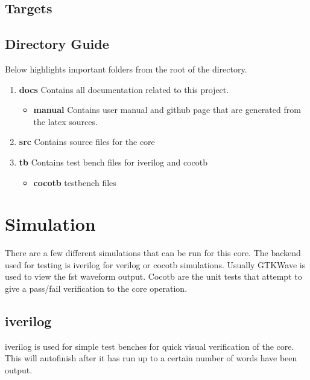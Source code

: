 \subsection{Targets}



\subsection{Directory Guide}

\par
Below highlights important folders from the root of the directory.

\begin{enumerate}
  \item \textbf{docs} Contains all documentation related to this project.
    \begin{itemize}
      \item \textbf{manual} Contains user manual and github page that are generated from the latex sources.
    \end{itemize}
  \item \textbf{src} Contains source files for the core
  \item \textbf{tb} Contains test bench files for iverilog and cocotb
    \begin{itemize}
      \item \textbf{cocotb} testbench files
    \end{itemize}
\end{enumerate}

\newpage

\section{Simulation}
\par
There are a few different simulations that can be run for this core. The backend used for testing is iverilog for verilog or cocotb simulations. Usually GTKWave is used to view the fst waveform output. Cocotb are the unit tests that attempt to give a pass/fail verification to the core operation.

\subsection{iverilog}
\par
iverilog is used for simple test benches for quick visual verification of the core. This will autofinish after it has
run up to a certain number of words have been output.

